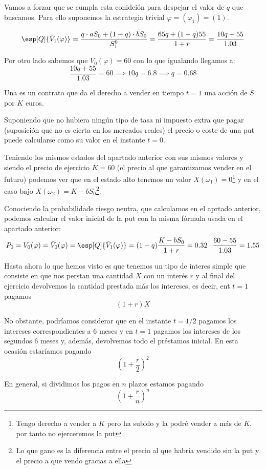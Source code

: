 \begin{problem}[1]
Vamos a forzar que se cumpla esta conidción para despejar el valor de $q$ que buscamos. Para ello suponemos la estrategia trivial $\varphi=(\varphi_1) =(1)$.

\[\esp[Q]{\tilde{V}_1(\varphi)} = \frac{q\cdot aS_0 + (1-q)\cdot bS_0}{S_1^0} = \frac{65q + (1-q)55}{1+r} = \frac{10q+55}{1.03}\]

Por otro lado sabemos que $V_0(\varphi) = 60$ con lo que igualando llegamos a:
\[\frac{10q+55}{1.03} = 60 \implies 10q = 6.8 \implies q = 0.68 \]

\spart

Una  es un contrato que da el derecho a vender en tiempo $t=1$ una acción de $S$ por $K$ euros.

Suponiendo que no hubiera ningún tipo de tasa ni impuesto extra que pagar (suposición que no es cierta en los mercados reales) el precio o coste de una put puede calcularse como su valor en el instante $t=0$.

Teniendo los mismos estados del apartado anterior con sus mismos valores y siendo el precio de ejercicio $K=60$ \texteuro (el precio al que garantizamos vender en el futuro) podemos ver que en el estado alto tenemos un valor $X(ω_1)=0$\footnote{Tengo derecho a vender a $K$ pero ha subido y la podré vender a más de $K$, por tanto no ejerceremos la put} y en el caso bajo $X(ω_2)=K-bS_0$\footnote{Lo que gano es la diferencia entre el precio al que habría vendido sin la put y el precio a que vendo gracias a ella}.

Conociendo la probabilidade riesgo neutra, que calculamos en el aprtado anterior, podemos calcular el valor inicial de la put con la misma fórmula usada en el apartado anterior:
\[P_0 = V_0(\varphi) = \tilde{V}_0(\varphi) = \esp[Q]{\tilde{V}_1(\varphi)} = (1-q) \frac{K-bS_0}{1+r} = 0.32 \cdot \frac{60-55}{1.03}=1.55\]

\spart

Hasta ahora lo que hemos visto es que tenemos un tipo de interes simple que consiste en que nos perstan una cantidad $X$ con un interés $r$ y al final del ejercicio devolvemos la cantidad prestada más los intereses, es decir, ent $t=1$ pagamos
\[(1+r)X\]

No obstante, podríamos considerar que en el instante $t=1/2$ pagamos los intereses correspondientes a 6 meses y en $t=1$ pagamos los intereses de los segundos 6 meses y, además, devolvemos todo el préstamos inicial. En esta ocasión estaríamos pagando
\[\left(1+\frac{r}{2}\right)^2\]

En general, si dividimos los pagos en $n$ plazos estamos pagando
\[\left( 1 + \frac{r}{n} \right)^n\]


\end{problem}
